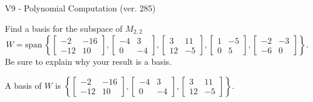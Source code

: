 \begin{exercise}
  \begin{exerciseTitle}V9 - Polynomial Computation (ver. 285)\end{exerciseTitle}
  \begin{exerciseStatement}
    Find a basis for the subspace of \(M_{2,2}\) 
\[W=\mathrm{span}\ \left\{\left[\begin{array}{cc}
-2 & -16 \\
-12 & 10
\end{array}\right] , \left[\begin{array}{cc}
-4 & 3 \\
0 & -4
\end{array}\right] , \left[\begin{array}{cc}
3 & 11 \\
12 & -5
\end{array}\right] , \left[\begin{array}{cc}
1 & -5 \\
0 & 5
\end{array}\right] , \left[\begin{array}{cc}
-2 & -3 \\
-6 & 0
\end{array}\right]\right\}.\]
 Be sure to explain why your result is a basis.


  \end{exerciseStatement}
  \begin{exerciseAnswer}
   A basis of \(W\) is  \(\left\{\left[\begin{array}{cc}
-2 & -16 \\
-12 & 10
\end{array}\right] , \left[\begin{array}{cc}
-4 & 3 \\
0 & -4
\end{array}\right] , \left[\begin{array}{cc}
3 & 11 \\
12 & -5
\end{array}\right]\right\}\).
  


  \end{exerciseAnswer}
\end{exercise}